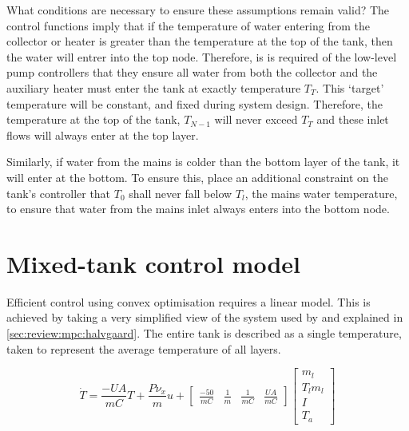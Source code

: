 What conditions are necessary to ensure these assumptions remain valid?
The control functions imply that if the temperature of water entering from the collector or heater is greater than the temperature at the top of the tank, then the water will entrer into the top node.
Therefore, is is required of the low-level pump controllers that they ensure all water from both the collector and the auxiliary heater must enter the tank at exactly temperature $T_T$.
This `target' temperature will be constant, and fixed during system design.
Therefore, the temperature at the top of the tank, $T_{N-1}$ will never exceed $T_T$ and these inlet flows will always enter at the top layer.

Similarly, if water from the mains is colder than the bottom layer of the tank, it will enter at the bottom.
To ensure this, place an additional constraint on the tank's controller that $T_0$ shall never fall below $T_l$, the mains water temperature, to ensure that water from the mains inlet always enters into the bottom node.


\section{Mixed-tank control model}

Efficient control using convex optimisation requires a linear model.
This is achieved by taking a very simplified view of the system used by  and explained in \autoref{sec:review:mpc:halvgaard}.
The entire tank is described as a single temperature, taken to represent the average temperature of all layers.

\begin{equation}
	\label{eq:tdot-halvgaard}
	\dot{T} = \frac{-UA}{mC}T + \frac{P \nu_x}{m} u +
		\left[ \begin{array}{cccc}
			\frac{-50}{mC} & \frac{1}{m} & \frac{1}{mC} & \frac{UA}{mC}
		\end{array} \right] \left[ \begin{array}{c}
			m_l \\ T_l m_l \\ I \\ T_a
		\end{array} \right]
\end{equation}

